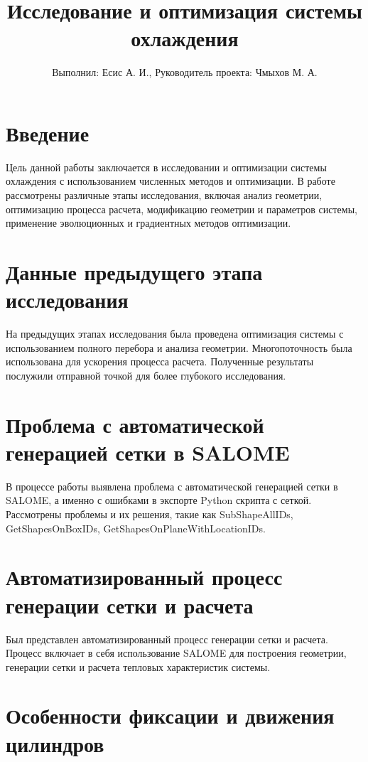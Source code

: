 \documentclass{beamer}
\begin{document}
\title{Исследование и оптимизация системы охлаждения}
\author{Выполнил: Есис А. И., Руководитель проекта: Чмыхов М. А.}
\maketitle

\section{Введение}

Цель данной работы заключается в исследовании и оптимизации системы охлаждения с использованием численных методов и оптимизации. В работе рассмотрены различные этапы исследования, включая анализ геометрии, оптимизацию процесса расчета, модификацию геометрии и параметров системы, применение эволюционных и градиентных методов оптимизации.

\section{Данные предыдущего этапа исследования}

На предыдущих этапах исследования была проведена оптимизация системы с использованием полного перебора и анализа геометрии. Многопоточность была использована для ускорения процесса расчета. Полученные результаты послужили отправной точкой для более глубокого исследования.

\section{Проблема с автоматической генерацией сетки в SALOME}

В процессе работы выявлена проблема с автоматической генерацией сетки в SALOME, а именно с ошибками в экспорте Python скрипта с сеткой. Рассмотрены проблемы и их решения, такие как SubShapeAllIDs, GetShapesOnBoxIDs, GetShapesOnPlaneWithLocationIDs.

\section{Автоматизированный процесс генерации сетки и расчета}

Был представлен автоматизированный процесс генерации сетки и расчета. Процесс включает в себя использование SALOME для построения геометрии, генерации сетки и расчета тепловых характеристик системы.

\section{Особенности фиксации и движения цилиндров}
\end{document}
